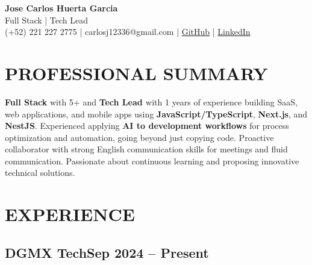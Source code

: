 \documentclass[a4paper,10pt]{article}
\newcommand{\kw}[1]{\textbf{\textcolor{keyword}{#1}}}
\begin{document}
\begin{center}
{\bfseries\LARGE Jose Carlos Huerta Garcia} \\
Full Stack | Tech Lead \\
(+52) 221 227 2775 | carlosj12336@gmail.com | \href{https://github.com/jcarloshg}{GitHub} | \href{https://www.linkedin.com/in/jose-carlos-huerta-garcia-773952212}{LinkedIn}
\end{center}

\section*{PROFESSIONAL SUMMARY}
\kw{Full Stack} with 5+ and \kw{Tech Lead } with 1 years of experience building SaaS, web applications, and mobile apps using \kw{JavaScript/TypeScript}, \kw{Next.js}, and \kw{NestJS}. Experienced applying \kw{AI to development workflows} for process optimization and automation, going beyond just copying code. Proactive collaborator with strong English communication skills for meetings and fluid communication. Passionate about continuous learning and proposing innovative technical solutions.

\section*{EXPERIENCE}

\subsection*{DGMX Tech\hfill\textbf{Sep 2024 -- Present}}
\end{document}
